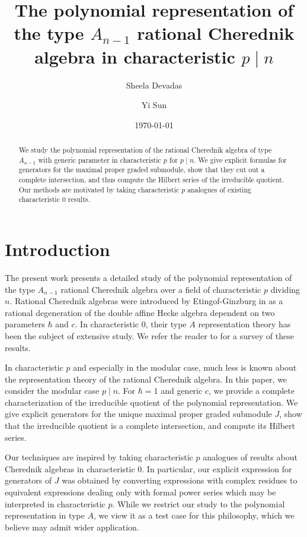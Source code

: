 \documentclass{amsart}
\numberwithin{equation}{section}
\theoremstyle{definition}
\begin{document}
\title[Polynomial representation of type $A_{n - 1}$ rational Cherednik algebra in characteristic $p \mid n$]{The polynomial representation of the type $A_{n - 1}$ rational Cherednik algebra in characteristic $p \mid n$}
\author{Sheela Devadas}
\author{Yi Sun}
\date{\today}

\begin{abstract}
We study the polynomial representation of the rational Cherednik algebra of type $A_{n-1}$ with generic parameter in characteristic $p$ for $p \mid n$. We give explicit formulas for generators for the maximal proper graded submodule, show that they cut out a complete intersection, and thus compute the Hilbert series of the irreducible quotient. Our methods are motivated by taking characteristic $p$ analogues of existing characteristic $0$ results.
\end{abstract}

\maketitle
\setcounter{tocdepth}{1}
\tableofcontents

\section{Introduction}

The present work presents a detailed study of the polynomial representation of the type $A_{n - 1}$ rational Cherednik algebra over a field of characteristic $p$ dividing $n$.  Rational Cherednik algebras were introduced by Etingof-Ginzburg in \cite{EG} as a rational degeneration of the double affine Hecke algebra dependent on two parameters $\hbar$ and $c$.  In characteristic $0$, their type $A$ representation theory has been the subject of extensive study.  We refer the reader to \cite{EM} for a survey of these results. 

In characteristic $p$ and especially in the modular case, much less is known about the representation theory of the rational Cherednik algebra.  In this paper, we consider the modular case $p \mid n$.  For $\hbar = 1$ and generic $c$, we provide a complete characterization of the irreducible quotient of the polynomial representation.  We give explicit generators for the unique maximal proper graded submodule $J$, show that the irreducible quotient is a complete intersection, and compute its Hilbert series.

Our techniques are inspired by taking characteristic $p$ analogues of results about Cherednik algebras in characteristic $0$.  In particular, our explicit expression for generators of $J$ was obtained by converting expressions with complex residues to equivalent expressions dealing only with formal power series which may be interpreted in characteristic $p$.  While we restrict our study to the polynomial representation in type $A$, we view it as a test case for this philosophy, which we believe may admit wider application.
\end{document}
